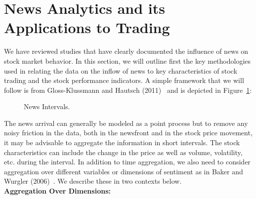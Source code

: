 \section{News Analytics and its Applications to Trading}


We have reviewed studies that have clearly documented the influence of news on stock market behavior. In this section, we will outline first the key methodologies used in relating the data on the inflow of news to key characteristics of stock trading and the stock performance indicators. A simple framework that we will follow is from Gloss-Klussmann and Hautsch (2011)~\cite{klub} and is depicted in Figure~\ref{fig:intervals}:
	
	\begin{figure}[!ht]
	\centering
	\caption{News Intervals.\label{fig:intervals}}
	\end{figure}

The news arrival can generally be modeled as a point process but to remove any noisy friction in the data, both in the newsfront and in the stock price movement, it may be advisable to aggregate the information in short intervals. The stock characteristics can include the change in the price as well as volume, volatility, etc. during the interval. In addition to time aggregation, we also need to consider aggregation over different variables or dimensions of sentiment as in Baker and Wurgler (2006)~\cite{baker2006investor}. We describe these in two contexts below. \\


\noindent\textbf{Aggregation Over Dimensions:} \\


